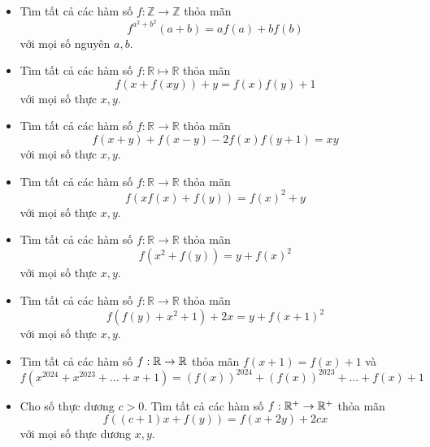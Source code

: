 \documentclass[11pt]{scrartcl}
\begin{document}
\begin{itemize}[label=, leftmargin=0em, itemsep=0.5em]
    \item \begin{btvn}
        Tìm tất cả các hàm số $f: \mathbb{Z} \to \mathbb{Z}$ thỏa mãn
        \[f^{a^{2} + b^{2}}(a+b) = af(a) +bf(b)\]
        với mọi số nguyên $a,b$.
    \end{btvn}

    \item \begin{btvn}
        Tìm tất cả các hàm số $f : \mathbb{R} \mapsto \mathbb{R}$ thỏa mãn
        $$f(x+f(xy))+y=f(x)f(y)+1$$
        với mọi số thực $x,y$.
    \end{btvn}

    \item \begin{btvn}
        Tìm tất cả các hàm số $f: \mathbb{R} \to \mathbb{R}$ thỏa mãn
        \[
            f(x + y) + f(x - y) - 2f(x)f(y + 1) = xy
        \]
        với mọi số thực $x,y$.
    \end{btvn}
    \item \begin{btvn}
        Tìm tất cả các hàm số $f: \mathbb{R} \to \mathbb{R}$ thỏa mãn
        \[
            f(xf(x) + f(y)) = f(x)^2 + y
        \]
        với mọi số thực $x,y$.
    \end{btvn}
    \item \begin{btvn}
        Tìm tất cả các hàm số $f: \mathbb{R} \to \mathbb{R}$ thỏa mãn
        \[
            f(x^2 + f(y)) = y + f(x)^2
        \]
        với mọi số thực $x,y$.
    \end{btvn}
    \item \begin{btvn}
        Tìm tất cả các hàm số $f: \mathbb{R} \to \mathbb{R}$ thỏa mãn
        \[
            f(f(y) + x^2 + 1) + 2x = y + f(x + 1)^2
        \]
        với mọi số thực $x,y$.
    \end{btvn}


    \item \begin{btvn}
        Tìm tất cả các hàm số $f: \mathbb{R} \to \mathbb{R}$ thỏa mãn $f(x + 1) =f(x) + 1$ và
        \[
            f(x^{2024} + x^{2023} + \dots + x + 1) = (f(x))^{2024} + (f(x))^{2023} + \dots + f(x) + 1
        \]
    \end{btvn}
    \item \begin{btvn}
        Cho số thực dương $c > 0$. Tìm tất cả các hàm số $f: \mathbb{R}^+ \to \mathbb{R}^+$ thỏa mãn
        \[
            f((c + 1)x +f(y)) = f(x + 2y) +2cx
        \]
        với mọi số thực dương $x,y$.
    \end{btvn}

\end{itemize}
\end{document}
